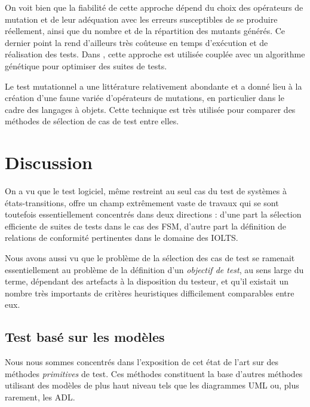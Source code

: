 On voit bien que la fiabilit\'e de cette approche  d\'epend du choix
des op\'erateurs de mutation et de leur ad\'equation avec les erreurs
susceptibles de se produire r\'eellement, ainsi que du nombre et de
la r\'epartition des mutants g\'en\'er\'es. Ce dernier point la
rend d'ailleurs tr\`es co\^uteuse en temps d'ex\'ecution et de
r\'ealisation des tests. Dans \cite{these-baudry}, cette approche est
utilis\'ee coupl\'ee avec un algorithme g\'en\'etique pour
optimiser des suites de tests.

Le test mutationnel a une litt\'erature relativement abondante et a
donn\'e lieu \`a la cr\'eation d'une faune vari\'ee
d'op\'erateurs de mutations, en particulier dans le cadre des
langages \`a objets. Cette technique est tr\`es
utilis\'ee pour comparer des  m\'ethodes de s\'election de cas de
test entre elles. 

\section{Discussion}

On a vu que le test logiciel, m\^eme restreint au seul cas du test de
syst\`emes \`a \'etats-transitions, offre un champ
extr\^emement vaste de travaux qui se sont toutefois essentiellement
concentr\'es dans deux directions : d'une part la s\'election
efficiente de suites de tests dans le cas des \textsf{FSM}, d'autre part la
d\'efinition de relations de conformit\'e pertinentes dans le
domaine des \textsf{IOLTS}. 

Nous avons aussi vu que le probl\`eme de la s\'election des cas de
test se ramenait essentiellement au probl\`eme de la d\'efinition
d'un \emph{objectif de test}, au sens large du terme, d\'ependant des
artefacts \`a la disposition du testeur, et qu'il existait un nombre
tr\`es importants de crit\`eres heuristiques difficilement
comparables entre eux.

\subsection{Test bas\'e sur les mod\`eles}

Nous nous sommes concentr\'es dans l'exposition de cet \'etat de
l'art sur des m\'ethodes \emph{primitives} de test. Ces m\'ethodes
constituent la  base d'autres m\'ethodes utilisant des mod\`eles
de plus haut niveau tels que les diagrammes \textsf{UML} ou, plus
rarement, les \textsf{ADL}.

